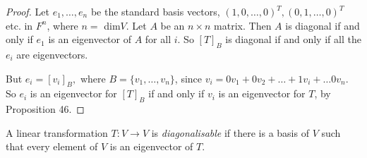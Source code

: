 \documentclass[10pt]{scrartcl}
\begin{document}
\begin{proof}
Let $e_1,\dots,e_n$ be the standard basis vectors, $(1,0,\dots,0)^T, (0,1,\dots,0)^T$ etc. in $F^n$, where $n =$ dim$V$. Let $A$ be an $n \times n$ matrix. Then $A$ is diagonal  if and only if $e_1$ is an eigenvector of $A$ for all $i$. So $[T]_B$ is diagonal if and only if all the $e_i$ are eigenvectors.
 
 But $e_i = [v_i]_B,$ where $B= \{v_1,\dots,v_n\}$, since $v_i = 0v_1 + 0v_2 + \dots + 1v_i + \dots 0v_n$. So $e_i$ is an eigenvector for $[T]_B$ if and only if $v_i$ is an eigenvector for $T$, by Proposition 46. 
\end{proof}

\begin{definition} A linear transformation $T: V \to V$ is \emph{diagonalisable} if there is a basis of $V$ such that every element of $V$ is an eigenvector of $T$.\end{definition}\vspace*{10pt}
\end{document}
